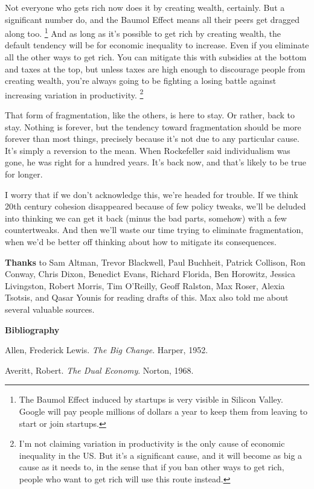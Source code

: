 \documentclass[12pt]{book}
\begin{document}
Not everyone who gets rich now does it by creating wealth, certainly.
But a significant number do, and the Baumol Effect means all their peers
get dragged along too. \footnote{The Baumol Effect induced by startups is very visible in
Silicon Valley. Google will pay people millions of dollars a year to
keep them from leaving to start or join startups.} And as long as it's
possible to get rich by creating wealth, the default tendency will be
for economic inequality to increase. Even if you eliminate all the other
ways to get rich. You can mitigate this with subsidies at the bottom and
taxes at the top, but unless taxes are high enough to discourage people
from creating wealth, you're always going to be fighting a losing battle
against increasing variation in productivity. \footnote{I'm not claiming variation in productivity is the only cause of
economic inequality in the US. But it's a significant cause, and it will
become as big a cause as it needs to, in the sense that if you ban other
ways to get rich, people who want to get rich will use this route
instead.}

That form of fragmentation, like the others, is here to stay. Or rather,
back to stay. Nothing is forever, but the tendency toward fragmentation
should be more forever than most things, precisely because it's not due
to any particular cause. It's simply a reversion to the mean. When
Rockefeller said individualism was gone, he was right for a hundred
years. It's back now, and that's likely to be true for longer.

I worry that if we don't acknowledge this, we're headed for trouble. If
we think 20th century cohesion disappeared because of few policy tweaks,
we'll be deluded into thinking we can get it back (minus the bad parts,
somehow) with a few countertweaks. And then we'll waste our time trying
to eliminate fragmentation, when we'd be better off thinking about how
to mitigate its consequences.


\textbf{Thanks} to Sam Altman, Trevor Blackwell, Paul Buchheit, Patrick
Collison, Ron Conway, Chris Dixon, Benedict Evans, Richard Florida, Ben
Horowitz, Jessica Livingston, Robert Morris, Tim O'Reilly, Geoff
Ralston, Max Roser, Alexia Tsotsis, and Qasar Younis for reading drafts
of this. Max also told me about several valuable sources.

\textbf{Bibliography}

Allen, Frederick Lewis. \emph{The Big Change}. Harper, 1952.

Averitt, Robert. \emph{The Dual Economy}. Norton, 1968.
\end{document}
